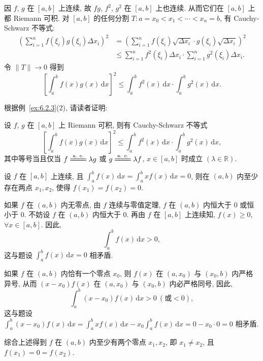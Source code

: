 \begin{solution}[证法 2]
因 $f$, $g$ 在 $[a,b]$ 上连续, 故 $fg$, $f^{2}$, $g^{2}$ 在 $[a,b]$ 上也连续. 从而它们在 $[a,b]$ 上都 Riemann 可积. 对 $[a,b]$ 的任何分割 $T:a=x_{0}<x_{1}<\cdots<x_{n}=b$, 有 Cauchy-Schwarz 不等式:
\begin{align*}
\left(\sum_{i=1}^{n}f(\xi_{i})g(\xi_{i})\Delta x_{i}\right)^{2}&=\left(\sum_{i=1}^{n}f(\xi_{i})\sqrt{\Delta x_{i}}\cdot g(\xi_{i})\sqrt{\Delta x_{i}}\right)^{2}\\
&\leqslant\sum_{i=1}^{n}f^{2}(\xi_{i})\Delta x_{i}\cdot\sum_{i=1}^{n}g^{2}(\xi_{i})\Delta x_{i}.
\end{align*}
令 $\|T\|\to 0$ 得到
\[
\left[\int_{a}^{b}f(x)g(x)\,\mathrm{d}x\right]^{2}\leqslant\int_{a}^{b}f^{2}(x)\,\mathrm{d}x\cdot\int_{a}^{b}g^{2}(x)\,\mathrm{d}x.
\]
\end{solution}

\begin{remark}\label{remark:6.2.2}
根据例~\ref{ex:6.2.3}(2), 请读者证明:

设 $f$, $g$ 在 $[a,b]$ 上 Riemann 可积, 则有 Cauchy-Schwarz 不等式
\[
\left[\int_{a}^{b}f(x)g(x)\,\mathrm{d}x\right]^{2}\leqslant\int_{a}^{b}f^{2}(x)\,\mathrm{d}x\cdot\int_{a}^{b}g^{2}(x)\,\mathrm{d}x,
\]
其中等号当且仅当 $f\xlongequal{\text{a. e.}}\lambda g$ 或 $g\xlongequal{\text{a. e.}}\lambda f$, $x\in[a,b]$ 时成立 $(\lambda\in\mathbb{R})$.
\end{remark}

\begin{example}\label{ex:6.2.8}
设 $f$ 在 $[a,b]$ 上连续, 且 $\int_{a}^{b}f(x)\,\mathrm{d}x=\int_{a}^{b}xf(x)\,\mathrm{d}x=0$, 则在 $(a,b)$ 内至少存在两点 $x_{1},x_{2}$, 使得 $f(x_{1})=f(x_{2})=0$.
\end{example}

\begin{solution}[证法 1]
如果 $f$ 在 $(a,b)$ 内无零点, 由 $f$ 连续与零值定理, $f$ 在 $(a,b)$ 内恒大于 $0$ 或恒小于 $0$. 不妨设 $f$ 在 $(a,b)$ 内恒大于 $0$. 再由 $f$ 在 $[a,b]$ 上连续知, $f(x)\geqslant 0$, $\forall x\in[a,b]$. 因此,
\[
\int_{a}^{b}f(x)\,\mathrm{d}x>0,
\]
这与题设 $\int_{a}^{b}f(x)\,\mathrm{d}x=0$ 相矛盾.

如果 $f$ 在 $(a,b)$ 内恰有一个零点 $x_{0}$, 则 $f(x)$ 在 $(a,x_{0})$ 与 $(x_{0},b)$ 内严格异号, 从而 $(x-x_{0})f(x)$ 在 $(a,x_{0})$ 与 $(x_{0},b)$ 内必严格同号, 因此,
\[
\int_{a}^{b}(x-x_{0})f(x)\,\mathrm{d}x>0\ (\text{或}<0),
\]
这与题设 $\int_{a}^{b}(x-x_{0})f(x)\,\mathrm{d}x=\int_{a}^{b}xf(x)\,\mathrm{d}x-x_{0}\int_{a}^{b}f(x)\,\mathrm{d}x=0-x_{0}\cdot 0=0$ 相矛盾.

综合上述得到 $f$ 在 $(a,b)$ 内至少有两个零点 $x_{1},x_{2}$, 即 $x_{1}\neq x_{2}$, 且 $f(x_{1})=0=f(x_{2})$.
\end{solution}

